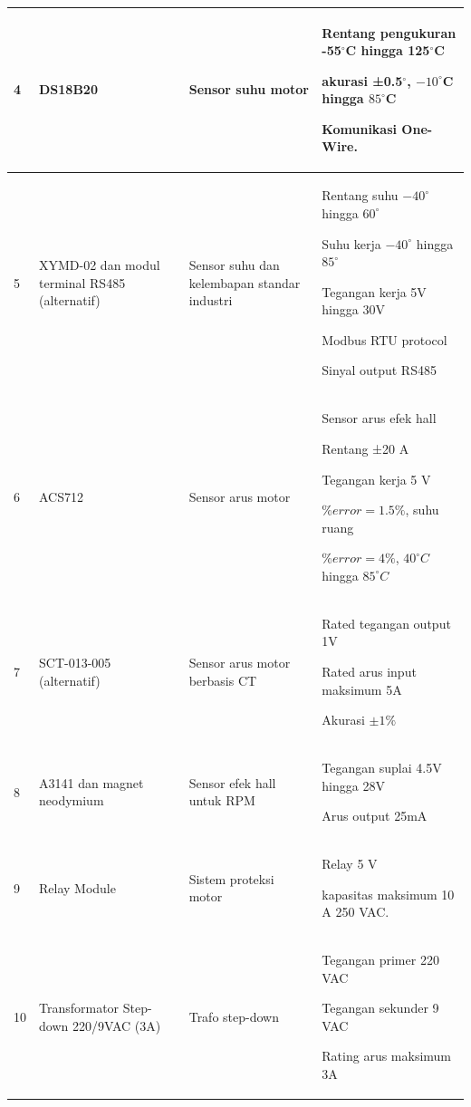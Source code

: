 \documentclass{elsinta}
\begin{document}
\begin{longtable} {|p{1cm}|p{3cm}|p{3cm}|p{6cm}|}
    4 &
    DS18B20\cite{AnalogDevicesInc2015} &
    Sensor suhu motor &
    Rentang pengukuran -55$^\circ$C hingga 125$^\circ$C
    
    akurasi ±0.5$^\circ$, $-10^{\circ}$C hingga $85^{\circ}$C
    
    Komunikasi One-Wire. \\
    \hline

    5&
    XYMD-02 dan modul terminal RS485\cite{XYMD02} (alternatif)&
    Sensor suhu dan kelembapan standar industri&
    Rentang suhu $-40^{\circ}$ hingga $60^{\circ}$

    Suhu kerja $-40^{\circ}$ hingga $85^{\circ}$

    Tegangan kerja 5V hingga 30V
    
    Modbus RTU protocol
    
    Sinyal output RS485\\
    \hline
    
    6&
    ACS712\cite{AllegroMicrosystems2020}&
    Sensor arus motor &
    Sensor arus efek hall
    
    Rentang ±20 A
    
    Tegangan kerja 5 V
    
    $\%error=1.5\%$, suhu ruang
    
    $\%error=4\%$, $40^{\circ}C$ hingga $85^{\circ}C$\\
    \hline

    7&
    SCT-013-005\cite{SCT013} (alternatif)&
    Sensor arus motor berbasis CT&
    Rated tegangan output 1V

    Rated arus input maksimum 5A

    Akurasi $\pm 1\%$\\
    \hline

    8&
    A3141\cite{AllegroMicrosystems2018} dan magnet neodymium &
    Sensor efek hall untuk RPM &
    Tegangan suplai 4.5V hingga 28V
    
    Arus output 25mA\\
    \hline
    
    9&
    Relay Module &
    Sistem proteksi motor &
    Relay 5 V
    
    kapasitas maksimum 10 A 250 VAC. \\
    \hline

    10&
    Transformator Step-down 220/9VAC (3A)&
    Trafo step-down&
    Tegangan primer 220 VAC

    Tegangan sekunder 9 VAC

    Rating arus maksimum 3A\\
    \hline


\end{longtable}
\end{document}
